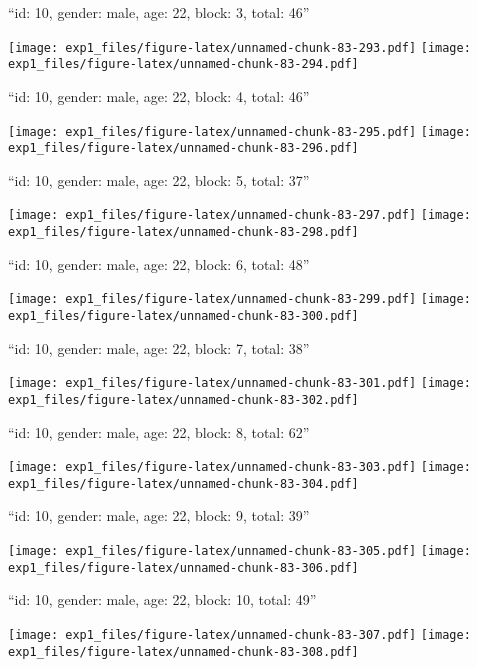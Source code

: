 \documentclass[11pt,,]{article}
\begin{document}
\newpage
[1] 

``id: 10, gender: male, age: 22, block: 3, total: 46''

\texttt{[image: exp1\_files/figure-latex/unnamed-chunk-83-293.pdf]}
\texttt{[image: exp1\_files/figure-latex/unnamed-chunk-83-294.pdf]}

\newpage
[1] 

``id: 10, gender: male, age: 22, block: 4, total: 46''

\texttt{[image: exp1\_files/figure-latex/unnamed-chunk-83-295.pdf]}
\texttt{[image: exp1\_files/figure-latex/unnamed-chunk-83-296.pdf]}

\newpage
[1] 

``id: 10, gender: male, age: 22, block: 5, total: 37''

\texttt{[image: exp1\_files/figure-latex/unnamed-chunk-83-297.pdf]}
\texttt{[image: exp1\_files/figure-latex/unnamed-chunk-83-298.pdf]}

\newpage
[1] 

``id: 10, gender: male, age: 22, block: 6, total: 48''

\texttt{[image: exp1\_files/figure-latex/unnamed-chunk-83-299.pdf]}
\texttt{[image: exp1\_files/figure-latex/unnamed-chunk-83-300.pdf]}

\newpage
[1] 

``id: 10, gender: male, age: 22, block: 7, total: 38''

\texttt{[image: exp1\_files/figure-latex/unnamed-chunk-83-301.pdf]}
\texttt{[image: exp1\_files/figure-latex/unnamed-chunk-83-302.pdf]}

\newpage
[1] 

``id: 10, gender: male, age: 22, block: 8, total: 62''

\texttt{[image: exp1\_files/figure-latex/unnamed-chunk-83-303.pdf]}
\texttt{[image: exp1\_files/figure-latex/unnamed-chunk-83-304.pdf]}

\newpage
[1] 

``id: 10, gender: male, age: 22, block: 9, total: 39''

\texttt{[image: exp1\_files/figure-latex/unnamed-chunk-83-305.pdf]}
\texttt{[image: exp1\_files/figure-latex/unnamed-chunk-83-306.pdf]}

\newpage
[1] 

``id: 10, gender: male, age: 22, block: 10, total: 49''

\texttt{[image: exp1\_files/figure-latex/unnamed-chunk-83-307.pdf]}
\texttt{[image: exp1\_files/figure-latex/unnamed-chunk-83-308.pdf]}
\end{document}
